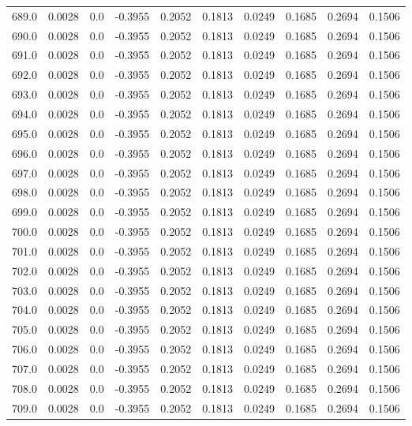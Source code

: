 \begin{longtable}{lrrrrrrrrr}
689.0 & 0.0028 & 0.0 & -0.3955 & 0.2052 & 0.1813 & 0.0249 & 0.1685 & 0.2694 & 0.1506 \\
690.0 & 0.0028 & 0.0 & -0.3955 & 0.2052 & 0.1813 & 0.0249 & 0.1685 & 0.2694 & 0.1506 \\
691.0 & 0.0028 & 0.0 & -0.3955 & 0.2052 & 0.1813 & 0.0249 & 0.1685 & 0.2694 & 0.1506 \\
692.0 & 0.0028 & 0.0 & -0.3955 & 0.2052 & 0.1813 & 0.0249 & 0.1685 & 0.2694 & 0.1506 \\
693.0 & 0.0028 & 0.0 & -0.3955 & 0.2052 & 0.1813 & 0.0249 & 0.1685 & 0.2694 & 0.1506 \\
694.0 & 0.0028 & 0.0 & -0.3955 & 0.2052 & 0.1813 & 0.0249 & 0.1685 & 0.2694 & 0.1506 \\
695.0 & 0.0028 & 0.0 & -0.3955 & 0.2052 & 0.1813 & 0.0249 & 0.1685 & 0.2694 & 0.1506 \\
696.0 & 0.0028 & 0.0 & -0.3955 & 0.2052 & 0.1813 & 0.0249 & 0.1685 & 0.2694 & 0.1506 \\
697.0 & 0.0028 & 0.0 & -0.3955 & 0.2052 & 0.1813 & 0.0249 & 0.1685 & 0.2694 & 0.1506 \\
698.0 & 0.0028 & 0.0 & -0.3955 & 0.2052 & 0.1813 & 0.0249 & 0.1685 & 0.2694 & 0.1506 \\
699.0 & 0.0028 & 0.0 & -0.3955 & 0.2052 & 0.1813 & 0.0249 & 0.1685 & 0.2694 & 0.1506 \\
700.0 & 0.0028 & 0.0 & -0.3955 & 0.2052 & 0.1813 & 0.0249 & 0.1685 & 0.2694 & 0.1506 \\
701.0 & 0.0028 & 0.0 & -0.3955 & 0.2052 & 0.1813 & 0.0249 & 0.1685 & 0.2694 & 0.1506 \\
702.0 & 0.0028 & 0.0 & -0.3955 & 0.2052 & 0.1813 & 0.0249 & 0.1685 & 0.2694 & 0.1506 \\
703.0 & 0.0028 & 0.0 & -0.3955 & 0.2052 & 0.1813 & 0.0249 & 0.1685 & 0.2694 & 0.1506 \\
704.0 & 0.0028 & 0.0 & -0.3955 & 0.2052 & 0.1813 & 0.0249 & 0.1685 & 0.2694 & 0.1506 \\
705.0 & 0.0028 & 0.0 & -0.3955 & 0.2052 & 0.1813 & 0.0249 & 0.1685 & 0.2694 & 0.1506 \\
706.0 & 0.0028 & 0.0 & -0.3955 & 0.2052 & 0.1813 & 0.0249 & 0.1685 & 0.2694 & 0.1506 \\
707.0 & 0.0028 & 0.0 & -0.3955 & 0.2052 & 0.1813 & 0.0249 & 0.1685 & 0.2694 & 0.1506 \\
708.0 & 0.0028 & 0.0 & -0.3955 & 0.2052 & 0.1813 & 0.0249 & 0.1685 & 0.2694 & 0.1506 \\
709.0 & 0.0028 & 0.0 & -0.3955 & 0.2052 & 0.1813 & 0.0249 & 0.1685 & 0.2694 & 0.1506 \\

\end{longtable}
